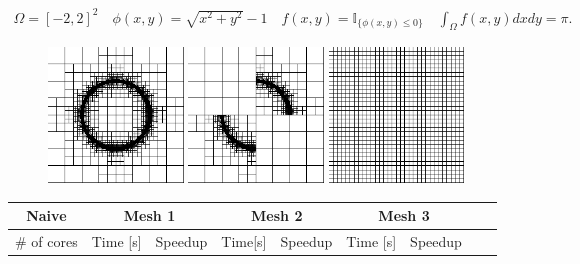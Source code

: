 \documentclass[8pt]{beamer}
\begin{document}
\begin{frame}\begin{footnotesize}
\begin{gather*}
  \Omega = [-2,2]^2 \quad \phi(x,y) = \sqrt{x^2+y^2}-1 \quad f(x,y) = \mathbb{I}_{\{\phi(x,y) \leq 0\}} \quad
  \int_{\Omega} f(x,y) dx dy = \pi.
\end{gather*}\end{footnotesize}
 \begin{figure}[!h]
\begin{center}
\includegraphics[width=0.32\textwidth]{./figures/integrator/pi_1.pdf}
\includegraphics[width=0.32\textwidth]{./figures/integrator/pi_2.pdf}
\includegraphics[width=0.32\textwidth]{./figures/integrator/pi_3.pdf}
\end{center}
\end{figure}
\begin{footnotesize}
\begin{center}
\begin{tabular}{|c|c|c|c|c|c|c|c|c|} 
   \hline
    \textbf{Naive} & \multicolumn{2}{|c|}{Mesh 1} & \multicolumn{2}{|c|}{Mesh 2} & \multicolumn{2}{|c|}{Mesh 3}\\
    \hline
    \# of cores & Time [s] & Speedup & Time[s] & Speedup & Time [s] & Speedup \\

\end{tabular}
\end{center}
\end{footnotesize}
\end{frame}
\end{document}
